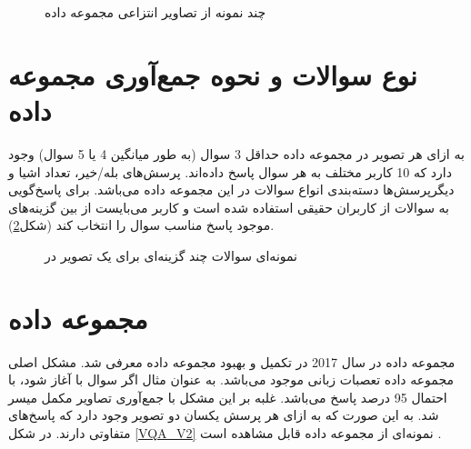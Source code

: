\begin{figure}[H]
	\caption{چند نمونه از تصاویر انتزاعی مجموعه داده  \cite{antol2015vqa}}
	\label{vqa-v1abs}
\end{figure}

\section{نوع سوالات و نحوه جمع‌آوری مجموعه داده
	}
به ازای هر تصویر در مجموعه داده
حداقل 3 سوال (به طور میانگین 4 یا 5 سوال) وجود دارد که 10 کاربر مختلف به هر سوال پاسخ داده‌اند. پرسش‌های بله/خیر، تعداد اشیا و دیگرپرسش‌ها دسته‌بندی انواع سوالات در این مجموعه داده می‌باشد. برای پاسخ‌گویی به سوالات از کاربران حقیقی استفاده شده است و کاربر می‌بایست از بین گزینه‌های موجود پاسخ مناسب سوال را انتخاب کند (شکل\ref{vqa-ui}).

\begin{figure}[H]
	\caption{نمونه‌ای  سوالات چند  گزینه‌ای برای یک تصویر در  
	 \cite{antol2015vqa}}
	\label{vqa-ui}
\end{figure}

\section{مجموعه داده
	}
مجموعه داده
در سال 2017 در تکمیل و بهبود مجموعه داده 
معرفی شد. مشکل اصلی مجموعه داده 
تعصبات زبانی
موجود می‌باشد. به عنوان مثال اگر سوال با 
آغاز شود، با احتمال 95 درصد پاسخ
می‌باشد. غلبه بر این مشکل با جمع‌آوری تصاویر مکمل میسر شد. به این صورت که به ازای هر پرسش یکسان دو تصویر وجود دارد که پاسخ‌های متفاوتی دارند. در شکل \ref{VQA_V2} نمونه‌ای از مجموعه داده
قابل مشاهده است \cite{balanced_vqa_v2}.

